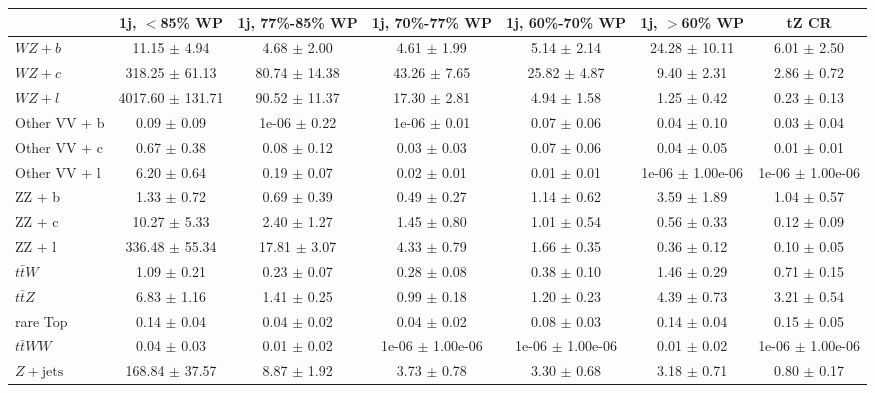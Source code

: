 \begin{tabular}{|l|S|S|S|S|S|S|}
\hline 
 & {1j, $<$85\% WP} & {1j, 77\%-85\% WP} & {1j, 70\%-77\% WP} & {1j, 60\%-70\% WP} & {1j, $>$60\% WP} & {tZ CR}\\
\hline 
  $WZ + b$   & 11.15 $\pm$ 4.94 & 4.68 $\pm$ 2.00 & 4.61 $\pm$ 1.99 & 5.14 $\pm$ 2.14 & 24.28 $\pm$ 10.11 & 6.01 $\pm$ 2.50 \\ 
  $WZ + c$   & 318.25 $\pm$ 61.13 & 80.74 $\pm$ 14.38 & 43.26 $\pm$ 7.65 & 25.82 $\pm$ 4.87 & 9.40 $\pm$ 2.31 & 2.86 $\pm$ 0.72 \\ 
  $WZ + l$   & 4017.60 $\pm$ 131.71 & 90.52 $\pm$ 11.37 & 17.30 $\pm$ 2.81 & 4.94 $\pm$ 1.58 & 1.25 $\pm$ 0.42 & 0.23 $\pm$ 0.13 \\ 
  Other VV + b   & 0.09 $\pm$ 0.09 & 1e-06 $\pm$ 0.22 & 1e-06 $\pm$ 0.01 & 0.07 $\pm$ 0.06 & 0.04 $\pm$ 0.10 & 0.03 $\pm$ 0.04 \\ 
  Other VV + c   & 0.67 $\pm$ 0.38 & 0.08 $\pm$ 0.12 & 0.03 $\pm$ 0.03 & 0.07 $\pm$ 0.06 & 0.04 $\pm$ 0.05 & 0.01 $\pm$ 0.01 \\ 
  Other VV + l   & 6.20 $\pm$ 0.64 & 0.19 $\pm$ 0.07 & 0.02 $\pm$ 0.01 & 0.01 $\pm$ 0.01 & 1e-06 $\pm$ 1.00e-06 & 1e-06 $\pm$ 1.00e-06 \\ 
  ZZ + b   & 1.33 $\pm$ 0.72 & 0.69 $\pm$ 0.39 & 0.49 $\pm$ 0.27 & 1.14 $\pm$ 0.62 & 3.59 $\pm$ 1.89 & 1.04 $\pm$ 0.57 \\ 
  ZZ + c   & 10.27 $\pm$ 5.33 & 2.40 $\pm$ 1.27 & 1.45 $\pm$ 0.80 & 1.01 $\pm$ 0.54 & 0.56 $\pm$ 0.33 & 0.12 $\pm$ 0.09 \\ 
  ZZ + l  & 336.48 $\pm$ 55.34 & 17.81 $\pm$ 3.07 & 4.33 $\pm$ 0.79 & 1.66 $\pm$ 0.35 & 0.36 $\pm$ 0.12 & 0.10 $\pm$ 0.05 \\ 
  $t\bar{t}W$   & 1.09 $\pm$ 0.21 & 0.23 $\pm$ 0.07 & 0.28 $\pm$ 0.08 & 0.38 $\pm$ 0.10 & 1.46 $\pm$ 0.29 & 0.71 $\pm$ 0.15 \\ 
  $t\bar{t}Z$   & 6.83 $\pm$ 1.16 & 1.41 $\pm$ 0.25 & 0.99 $\pm$ 0.18 & 1.20 $\pm$ 0.23 & 4.39 $\pm$ 0.73 & 3.21 $\pm$ 0.54 \\ 
  rare Top   & 0.14 $\pm$ 0.04 & 0.04 $\pm$ 0.02 & 0.04 $\pm$ 0.02 & 0.08 $\pm$ 0.03 & 0.14 $\pm$ 0.04 & 0.15 $\pm$ 0.05 \\ 
  $t\bar{t}WW$   & 0.04 $\pm$ 0.03 & 0.01 $\pm$ 0.02 & 1e-06 $\pm$ 1.00e-06 & 1e-06 $\pm$ 1.00e-06 & 0.01 $\pm$ 0.02 & 1e-06 $\pm$ 1.00e-06 \\ 
  $Z+\text{jets}$   & 168.84 $\pm$ 37.57 & 8.87 $\pm$ 1.92 & 3.73 $\pm$ 0.78 & 3.30 $\pm$ 0.68 & 3.18 $\pm$ 0.71 & 0.80 $\pm$ 0.17 \\ 

\end{tabular}
